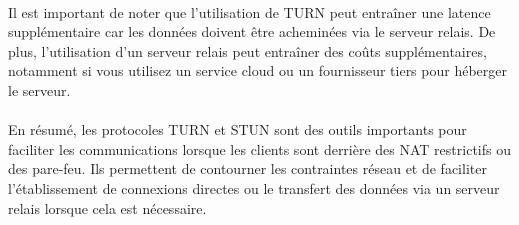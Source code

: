 \paragraph{}
Il est important de noter que l'utilisation de TURN peut entraîner une latence supplémentaire car les données doivent être acheminées via le serveur relais. De plus, l'utilisation d'un serveur relais peut entraîner des coûts supplémentaires, 
notamment si vous utilisez un service cloud ou un fournisseur tiers pour héberger le serveur.

\paragraph{}
En résumé, les protocoles TURN et STUN sont des outils importants pour faciliter les communications lorsque les clients sont derrière des NAT restrictifs ou des pare-feu. Ils permettent de contourner les contraintes réseau et de 
faciliter l'établissement de connexions directes ou le transfert des données via un serveur relais lorsque cela est nécessaire.
